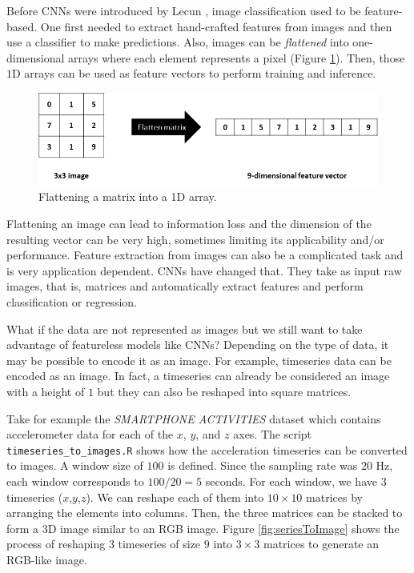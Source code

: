 \documentclass[
  11pt,
]{krantz}
\begin{document}
Before CNNs were introduced by Lecun \citep{lecun1998gradient}, image classification used to be feature-based. One first needed to extract hand-crafted features from images and then use a classifier to make predictions. Also, images can be \emph{flattened} into one-dimensional arrays where each element represents a pixel (Figure \ref{fig:flattening}). Then, those \(1\)D arrays can be used as feature vectors to perform training and inference.

\begin{figure}

{\centering \includegraphics[width=0.8\linewidth]{images/flattening} 

}

\caption{Flattening a matrix into a 1D array.}\label{fig:flattening}
\end{figure}

Flattening an image can lead to information loss and the dimension of the resulting vector can be very high, sometimes limiting its applicability and/or performance. Feature extraction from images can also be a complicated task and is very application dependent. CNNs have changed that. They take as input raw images, that is, matrices and automatically extract features and perform classification or regression.

What if the data are not represented as images but we still want to take advantage of featureless models like CNNs? Depending on the type of data, it may be possible to encode it as an image. For example, timeseries data can be encoded as an image. In fact, a timeseries can already be considered an image with a height of \(1\) but they can also be reshaped into square matrices.

Take for example the \emph{SMARTPHONE ACTIVITIES} dataset which contains accelerometer data for each of the \(x\), \(y\), and \(z\) axes. The script \texttt{timeseries\_to\_images.R} shows how the acceleration timeseries can be converted to images. A window size of \(100\) is defined. Since the sampling rate was \(20\) Hz, each window corresponds to \(100/20 = 5\) seconds. For each window, we have \(3\) timeseries (\(x\),\(y\),\(z\)). We can reshape each of them into \(10 \times 10\) matrices by arranging the elements into columns. Then, the three matrices can be stacked to form a \(3\)D image similar to an RGB image. Figure \ref{fig:seriesToImage} shows the process of reshaping \(3\) timeseries of size \(9\) into \(3 \times 3\) matrices to generate an RGB-like image.
\end{document}
